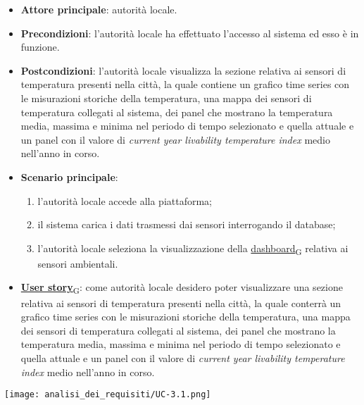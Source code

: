 \newpage
{}
\begin{itemize}
	\item \textbf{Attore principale}: autorità locale.
	\item \textbf{Precondizioni}: l'autorità locale ha effettuato l'accesso al sistema ed esso è in funzione.
	\item \textbf{Postcondizioni}: l'autorità locale visualizza la sezione relativa ai sensori di temperatura presenti nella città, la quale contiene un grafico time series con le misurazioni storiche della temperatura, una mappa dei sensori di temperatura collegati al sistema, dei panel che mostrano la temperatura media, massima e minima nel periodo di tempo selezionato e quella attuale e un panel con il valore di \textit{current year livability temperature index} medio nell'anno in corso.
	\item \textbf{Scenario principale}:
	      \begin{enumerate}
		      \item l'autorità locale accede alla piattaforma;
		      \item il sistema carica i dati trasmessi dai sensori interrogando il database;
		      \item l'autorità locale seleziona la visualizzazione della \href{https://7last.github.io/docs/pb/documentazione-interna/glossario\#dashboard}{dashboard\textsubscript{G}} relativa ai sensori ambientali.
	      \end{enumerate}
	\item \href{https://7last.github.io/docs/pb/documentazione-interna/glossario\#user-story}{\textbf{User story}\textsubscript{G}}:
	      come autorità locale desidero poter visualizzare una sezione relativa ai sensori di temperatura presenti nella città, la quale
	      conterrà un grafico time series con le misurazioni storiche della temperatura, una mappa dei sensori di temperatura collegati al sistema, dei panel che mostrano la temperatura media, massima e minima nel periodo di tempo selezionato e quella attuale e un panel con il valore di \textit{current year livability temperature index} medio nell'anno in corso.
\end{itemize}
\begin{center}
	\texttt{[image: analisi\_dei\_requisiti/UC-3.1.png]}
\end{center}

